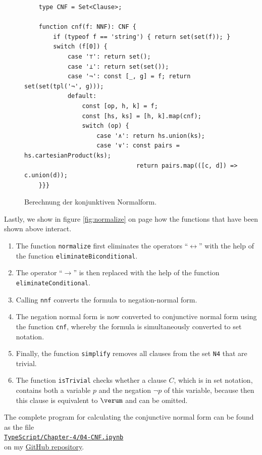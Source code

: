 \begin{figure}[!ht]
  \centering
\begin{verbatim}
    type CNF = Set<Clause>;
                
    function cnf(f: NNF): CNF {
        if (typeof f == 'string') { return set(set(f)); }
        switch (f[0]) {
            case '⊤': return set();     
            case '⊥': return set(set());
            case '¬': const [_, g] = f; return set(set(tpl('¬', g))); 
            default: 
                const [op, h, k] = f;
                const [hs, ks] = [h, k].map(cnf); 
                switch (op) { 
                    case '∧': return hs.union(ks);
                    case '∨': const pairs = hs.cartesianProduct(ks);
                               return pairs.map(([c, d]) => c.union(d)); 
    }}}
\end{verbatim}
\vspace*{-0.3cm}
  \caption{Berechnung der konjunktiven Normalform. }
  \label{fig:cnf}
\end{figure}
Lastly, we show in figure \ref{fig:normalize} on page \pageref{fig:normalize}
how the functions that have been shown above interact.
\begin{enumerate}
\item The function \texttt{normalize} first eliminates the operators ``$\leftrightarrow$''
       with the help of the function \linebreak
      \texttt{eliminateBiconditional}.
\item The operator ``$\rightarrow$'' is then replaced with the help of the function
      \texttt{eliminateConditional}.
\item Calling \texttt{nnf} converts the formula to negation-normal form.
\item The negation normal form is now converted to conjunctive normal form using the function \texttt{cnf},
      whereby the formula is simultaneously converted to set notation.  
\item Finally, the function \texttt{simplify} removes all clauses from the set \texttt{N4} that are trivial.
\item The function \texttt{isTrivial} checks whether a clause $C$, which is in set notation,
      contains both a variable $p$ and the negation $\neg p$ of this variable, because then this
      clause is equivalent to $\verum$ and can be omitted.
\end{enumerate}
The complete program for calculating the conjunctive normal form can be found as the file
\\[0.2cm]
\hspace*{1.3cm}
\href{https://github.com/karlstroetmann/Logic/blob/master/TypeScript/Chapter-4/04-CNF.ipynb}{\texttt{TypeScript/Chapter-4/04-CNF.ipynb}} 
\\[0.2cm]
on my \href{https://github.com/karlstroetmann/Logic}{GitHub repository}.


